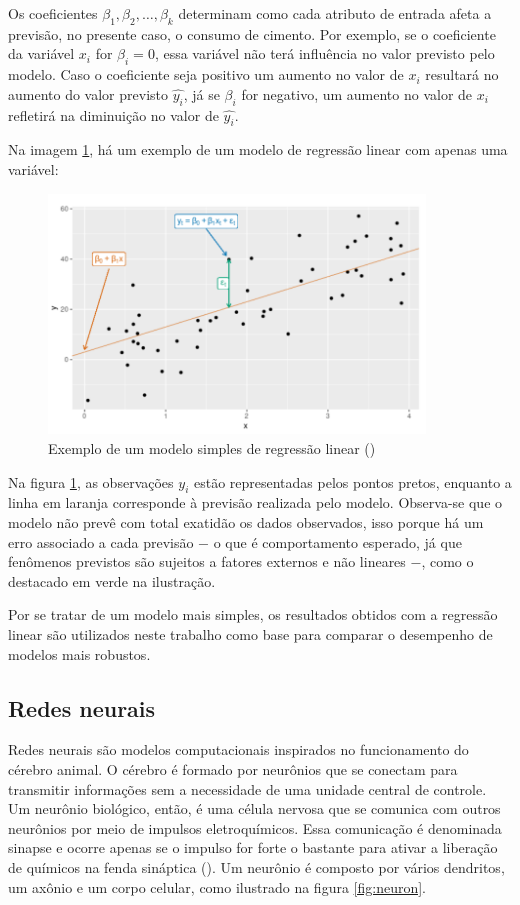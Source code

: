 Os coeficientes $\beta_1, \beta_2, \dots, \beta_k$ 
determinam como cada atributo de entrada afeta a previsão, no presente caso, o consumo de cimento.
Por exemplo, se o coeficiente da variável $x_i$ for $\beta_i = 0$,
essa variável não terá influência no valor previsto pelo modelo. 
Caso o coeficiente seja positivo um aumento 
no valor de $x_i$ resultará no aumento do valor previsto $\hat{y_i}$,
já se $\beta_i$ for negativo, um aumento no valor de $x_i$  refletirá na 
diminuição no valor de $\hat{y_i}$. 


Na imagem \ref{fig:reg_lin}, há um exemplo de um modelo de regressão 
linear com apenas uma variável:

\begin{figure}[H] 
  \includegraphics[width= 10cm]{../figuras/reg_lin.png}
  \caption{Exemplo de um modelo simples de regressão linear
  (\cite{forecasting})}
  \label{fig:reg_lin}
\end{figure}

Na  figura \ref{fig:reg_lin}, as observações $y_i$ estão 
representadas pelos pontos pretos, enquanto a linha em laranja
corresponde à previsão realizada pelo modelo. Observa-se que
o modelo não prevê com total exatidão os dados observados, isso porque há 
um erro associado a cada previsão $-$ o que é comportamento esperado, já que fenômenos previstos são 
sujeitos a fatores externos e não lineares $-$, como o destacado em verde 
na ilustração.


Por se tratar de um modelo mais simples, os resultados obtidos
com a regressão linear são utilizados neste trabalho como base 
para comparar o desempenho de modelos mais robustos.

\subsection{Redes neurais}

Redes neurais são modelos computacionais inspirados no funcionamento
do cérebro animal. O cérebro é formado por neurônios que se
conectam para transmitir informações sem a necessidade de 
uma unidade central de controle. Um neurônio biológico, então, 
é uma célula nervosa que se comunica com outros neurônios 
por meio de impulsos eletroquímicos. Essa comunicação é 
denominada sinapse e ocorre apenas se o impulso 
for forte o bastante para ativar a liberação de
químicos na fenda sináptica (\cite{deeplearningbook}). 
Um neurônio é composto por vários dendritos, 
um axônio e um corpo celular, como ilustrado na figura \ref{fig:neuron}. 


